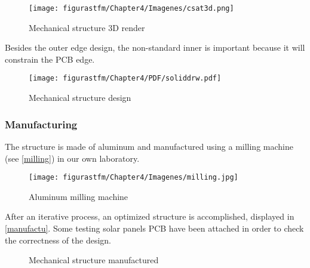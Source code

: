 \begin{figure} [H]
			\centering
			\texttt{[image: figurastfm/Chapter4/Imagenes/csat3d.png]}
			\caption{Mechanical structure 3D render} \label{cubesatrender}
\end{figure}

Besides the outer edge design, the non-standard inner is important because it will constrain the \acrshort{PCB} edge.

\begin{landscape}
\begin{figure} [H]
			\centering
			\texttt{[image: figurastfm/Chapter4/PDF/soliddrw.pdf]}
			\caption{Mechanical structure design} \label{drawings}
\end{figure}
\end{landscape}

\subsubsection{Manufacturing}

The structure is made of aluminum and manufactured using a milling machine (see \autoref{milling}) in our own laboratory. 

\begin{figure} [H]
			\centering
			\texttt{[image: figurastfm/Chapter4/Imagenes/milling.jpg]}
			\caption{Aluminum milling machine} \label{milling}
			\vspace{-0.5cm}
\end{figure}

After an iterative process, an optimized structure is accomplished, displayed in \autoref{manufactu}. Some testing solar panels \acrshort{PCB} have been attached in order to check the correctness of the design.

			\begin{figure}[H]
			\centering
			\quad
			\caption{Mechanical structure manufactured} \label{manufactu}
			\vspace{-2cm}
\end{figure}


